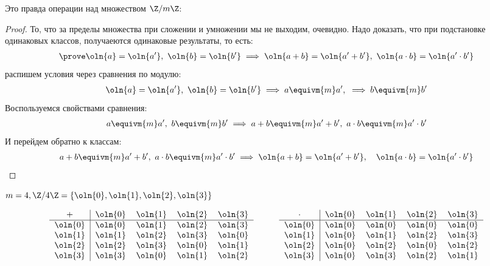 \begin{theorem-non}
    Это правда операции над множеством $\Z/m\Z$:
\end{theorem-non}
\begin{proof}
    То, что за пределы множества при сложении и умножении мы не выходим, очевидно.
    Надо доказать, что при подстановке одинаковых классов, получаеются одинаковые результаты, то есть:
    \begin{gather*}
        \prove \oln{a} = \oln{a'},~ \oln{b} = \oln{b'} \implies \oln{a + b} = \oln{a' + b'},~\oln{a \cdot b} = \oln{a' \cdot b'}
    \end{gather*}
    распишем условия через сравнения по модулю:
    \begin{gather*}
        \oln{a} = \oln{a'},~\oln{b} = \oln{b'} \implies a \equivm{m} a',~\implies b \equivm{m} b'
    \end{gather*}
    Воспользуемся свойствами сравнения:
    \begin{gather*}
        a \equivm{m} a',~ b \equivm{m} b' \implies a + b \equivm{m} a' + b',~ a \cdot b \equivm{m} a' \cdot b'
    \end{gather*}
    И перейдем обратно к классам:
    \begin{gather*}
        a + b \equivm{m} a' + b',~ a \cdot b \equivm{m} a' \cdot b' \implies \oln{a + b} = \oln{a' + b'}, \quad \oln{a \cdot b} = \oln{a' \cdot b'}
    \end{gather*}
\end{proof}

\begin{example}
    $m = 4, \Z/4\Z = \{\oln{0}, \oln{1}, \oln{2}, \oln{3}\}$
\end{example}

\[
\begin{tabular}{c|cccc}
    $+$ & $\oln{0}$ & $\oln{1}$ & $\oln{2}$ & $\oln{3}$\\
    \hline
    $\oln{0}$ & $\oln{0}$ & $\oln{1}$ & $\oln{2}$ & $\oln{3}$\\
    $\oln{1}$ & $\oln{1}$ & $\oln{2}$ & $\oln{3}$ & $\oln{0}$\\
    $\oln{2}$ & $\oln{2}$ & $\oln{3}$ & $\oln{0}$ & $\oln{1}$\\
    $\oln{3}$ & $\oln{3}$ & $\oln{0}$ & $\oln{1}$ & $\oln{2}$
\end{tabular}
\quad\quad\quad
\begin{tabular}{c|cccc}
    $\cdot$ & $\oln{0}$ & $\oln{1}$ & $\oln{2}$ & $\oln{3}$\\
    \hline
    $\oln{0}$ & $\oln{0}$ & $\oln{0}$ & $\oln{0}$ & $\oln{0}$\\
    $\oln{1}$ & $\oln{0}$ & $\oln{1}$ & $\oln{2}$ & $\oln{3}$\\
    $\oln{2}$ & $\oln{0}$ & $\oln{2}$ & $\oln{0}$ & $\oln{2}$\\
    $\oln{3}$ & $\oln{0}$ & $\oln{3}$ & $\oln{2}$ & $\oln{1}$
\end{tabular}
\]

